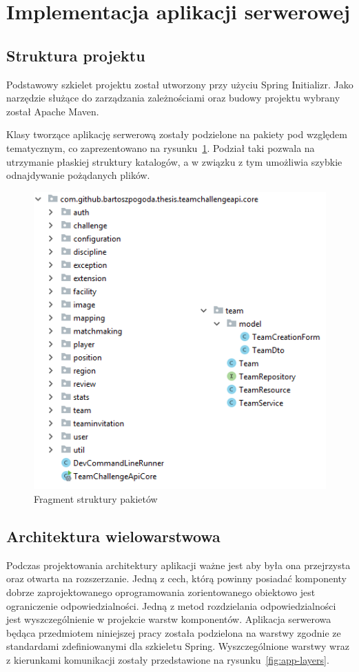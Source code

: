 \section{Implementacja aplikacji serwerowej}

\subsection{Struktura projektu}

Podstawowy szkielet projektu został utworzony przy użyciu Spring Initializr. Jako narzędzie służące do zarządzania zależnościami oraz budowy projektu wybrany został Apache Maven. 

  Klasy tworzące aplikację serwerową zostały podzielone na pakiety pod względem tematycznym, co zaprezentowano na rysunku~\ref{fig:packages}. Podział taki pozwala na utrzymanie płaskiej struktury katalogów, a w związku z tym umożliwia szybkie odnajdywanie pożądanych plików.
  
  
\begin{figure}[ht]
\centering
\includegraphics[width=0.5\linewidth]{06-implementacja/rys/package-team.PNG}
\caption{Fragment struktury pakietów}
\label{fig:packages}
\end{figure}

\subsection{Architektura wielowarstwowa}

Podczas projektowania architektury aplikacji ważne jest aby była ona przejrzysta oraz otwarta na rozszerzanie. Jedną z cech, którą powinny posiadać komponenty dobrze zaprojektowanego oprogramowania zorientowanego obiektowo jest ograniczenie odpowiedzialności. Jedną z metod rozdzielania odpowiedzialności jest wyszczególnienie w projekcie warstw komponentów. Aplikacja serwerowa będąca przedmiotem niniejszej pracy została podzielona na warstwy zgodnie ze standardami zdefiniowanymi dla szkieletu Spring. Wyszczególnione warstwy wraz z kierunkami komunikacji zostały przedstawione na rysunku~\ref{fig:app-layers}.


